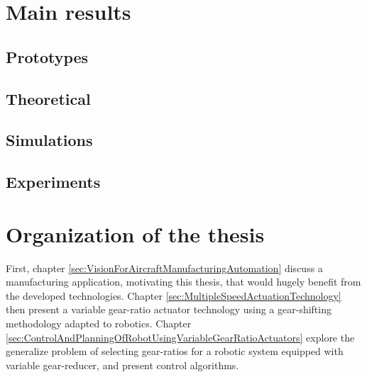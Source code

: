 \section{Main results}
\label{sec:mainresults}



\subsection{Prototypes}


\subsection{Theoretical}


\subsection{Simulations}


\subsection{Experiments}




\section{Organization of the thesis}
\label{sec:OrganisationOfTheThesis}

First, chapter \ref{sec:VisionForAircraftManufacturingAutomation} discuss a manufacturing application, motivating this thesis, that would hugely benefit from the developed technologies. Chapter \ref{sec:MultipleSpeedActuationTechnology} then present a variable gear-ratio actuator technology using a gear-shifting methodology adapted to robotics. Chapter \ref{sec:ControlAndPlanningOfRobotUsingVariableGearRatioActuators} explore the generalize problem of selecting gear-ratios for a robotic system equipped with variable gear-reducer, and present control algorithms. 


